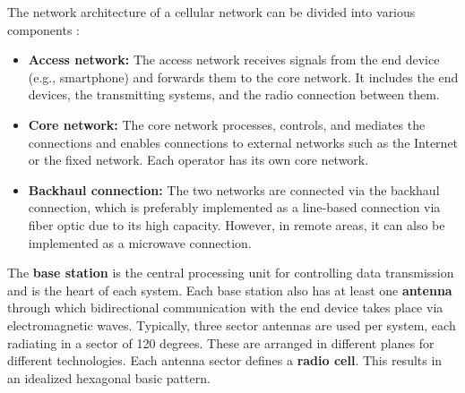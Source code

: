 \begin{English}
    The network architecture of a cellular network can be divided into various components \cite{behnkeGrundkursMobilfunkUnd2022,jiangCellularCommunicationNetworks2024}:

    \begin{itemize}
        \item \textbf{Access network:} The access network receives signals from the end device (e.g., smartphone) and forwards them to the core network. It includes the end devices, the transmitting systems, and the radio connection between them.
        \item \textbf{Core network:} The core network processes, controls, and mediates the connections and enables connections to external networks such as the Internet or the fixed network. Each operator has its own core network.
        \item \textbf{Backhaul connection:} The two networks are connected via the backhaul connection, which is preferably implemented as a line-based connection via fiber optic due to its high capacity. However, in remote areas, it can also be implemented as a microwave connection.
    \end{itemize}

    The \textbf{base station} is the central processing unit for controlling data transmission and is the heart of each system. Each base station also has at least one \textbf{antenna} through which bidirectional communication with the end device takes place via electromagnetic waves. Typically, three sector antennas are used per system, each radiating in a sector of 120 degrees. These are arranged in different planes for different technologies. Each antenna sector defines a \textbf{radio cell}. This results in an idealized hexagonal basic pattern. \cite{behnkeGrundkursMobilfunkUnd2022}
\end{English}

